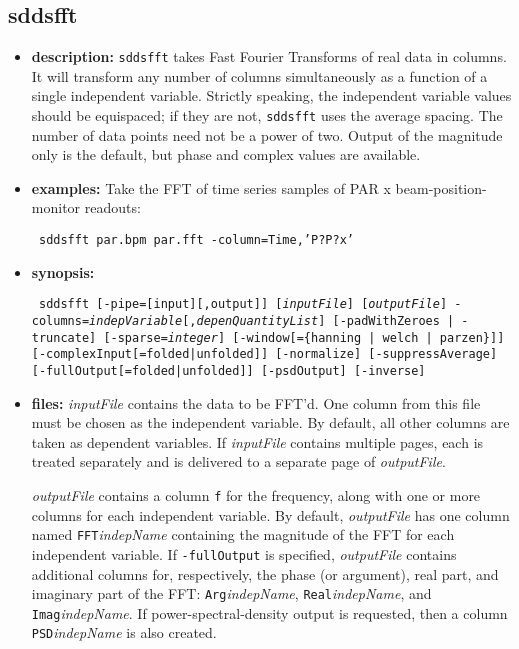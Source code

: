 \begin{latexonly}
\newpage
\end{latexonly}
\subsection{sddsfft}
\label{sddsfft}

\begin{itemize}
\item {\bf description:}
{\tt sddsfft} takes Fast Fourier Transforms of real data in columns.  It will transform any number of columns
simultaneously as a function of a single independent variable.  
Strictly speaking, the independent variable values should be equispaced; if they are not, {\tt sddsfft} uses
the average spacing.  The number of data points need not be a power of two.  Output of the magnitude only is the 
default, but phase and complex values are available.
\item {\bf examples:} 
Take the FFT of time series samples of PAR x beam-position-monitor readouts:
\begin{flushleft}{\tt
sddsfft par.bpm par.fft -column=Time,'P?P?x'
}\end{flushleft}
\item {\bf synopsis:} 
\begin{flushleft}{\tt
sddsfft [-pipe=[input][,output]] [{\em inputFile}] [{\em outputFile}]
-columns={\em indepVariable}[,{\em depenQuantityList}]
[-padWithZeroes | -truncate] [-sparse={\em integer}] 
[-window[=\{hanning | welch | parzen\}]] [-complexInput[=folded|unfolded]]
[-normalize] [-suppressAverage] [-fullOutput[=folded|unfolded]] [-psdOutput] [-inverse]
}\end{flushleft}
\item {\bf files:}
{\em inputFile} contains the data to be FFT'd.  One column from this file must be chosen as the independent
variable.   By default, all other columns are taken as dependent variables.  If {\em inputFile} contains multiple
pages, each is treated separately and is delivered to a separate page of {\em outputFile}.

{\em outputFile} contains a column {\tt f} for the frequency, along with one or more columns for each independent
variable.  By default, {\em outputFile} has one column named {\tt FFT}{\em indepName} containing the magnitude of the
FFT for each independent variable. If {\tt -fullOutput} is specified, {\em outputFile} contains additional
columns for, respectively, the phase (or argument), real part, and imaginary part of the FFT: {\tt Arg}{\em indepName},
{\tt Real}{\em indepName}, and {\tt Imag}{\em indepName}.  If power-spectral-density output is requested, then
a column {\tt PSD}{\em indepName} is also created.  


\end{itemize}
